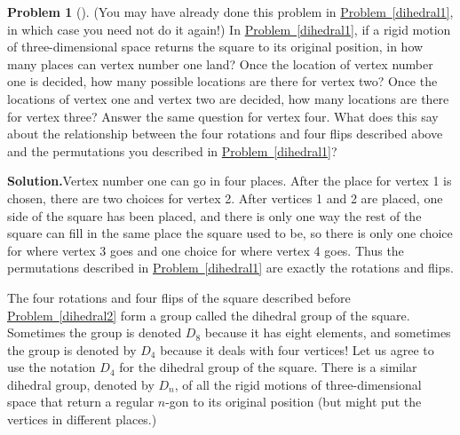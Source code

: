 \documentclass[10pt,]{book}
\theoremstyle{plain}
\theoremstyle{definition}
\newtheorem{activity}[project]{Problem}
\theoremstyle{definition}
\numberwithin{equation}{chapter}
\begin{document}
\begin{activity}[]\label{activity-260}
(You may have already done this problem in \hyperref[dihedral1]{Problem~\ref{dihedral1}}, in which case you need not do it again!) In \hyperref[dihedral1]{Problem~\ref{dihedral1}}, if a rigid motion of three-dimensional space returns the square to its original position, in how many places can vertex number one land? Once the location of vertex number one is decided, how many possible locations are there for vertex two? Once the locations of vertex one and vertex two are decided, how many locations are there for vertex three? Answer the same question for vertex four. What does this say about the relationship between the four rotations and four flips described above and the permutations you described in \hyperref[dihedral1]{Problem~\ref{dihedral1}}?%
\par\medskip\noindent%
\textbf{Solution.}\quad Vertex number one can go in four places. After the place for vertex 1 is chosen, there are two choices for vertex 2. After vertices 1 and 2 are placed, one side of the square has been placed, and there is only one way the rest of the square can fill in the same place the square used to be, so there is only one choice for where vertex 3 goes and one choice for where vertex 4 goes. Thus the permutations described in \hyperref[dihedral1]{Problem~\ref{dihedral1}} are exactly the rotations and flips.%
\end{activity}
The four rotations and four flips of the square described before \hyperref[dihedral2]{Problem~\ref{dihedral2}} form a group called the dihedral group of the square. Sometimes the group is denoted \(D_8\) because it has eight elements, and sometimes the group is denoted by \(D_4\) because it deals with four vertices! Let us agree to use the notation \(D_4\) for the dihedral group of the square. There is a similar dihedral group, denoted by \(D_{n}\), of all the rigid motions of three-dimensional space that return a regular \(n\)-gon to its original position (but might put the vertices in different places.)%
\end{document}
